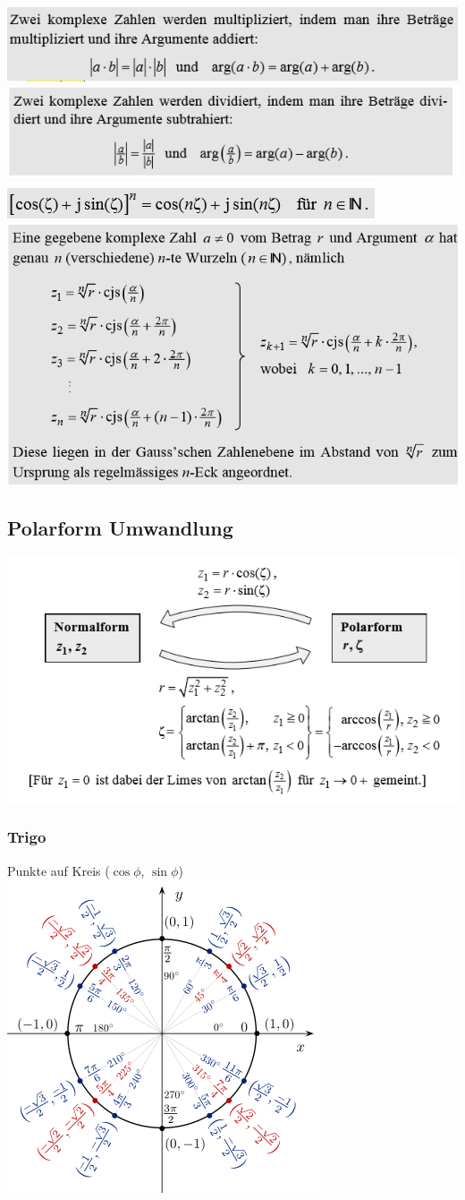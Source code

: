 \includegraphics[width=0.7\linewidth]{Images/screenshot004}
\includegraphics[width=0.7\linewidth]{Images/screenshot005}
\includegraphics[width=0.7\linewidth]{Images/screenshot003}
\includegraphics[width=0.7\linewidth]{Images/screenshot006}


\subsection{Polarform Umwandlung}
\includegraphics[width=0.7\linewidth]{Images/screenshot002}

\subsubsection{Trigo}
Punkte auf Kreis ($\cos\phi$, $\sin\phi$)\\
\includegraphics[width=0.7\linewidth]{Images/einheitskreis}
